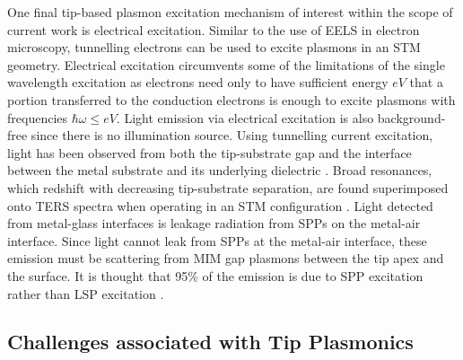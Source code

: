 \documentclass{article}
\begin{document}
One final tip-based plasmon excitation mechanism of interest within the scope of current work is electrical excitation. Similar to the use of EELS in electron microscopy, tunnelling electrons can be used to excite plasmons in an STM geometry. Electrical excitation circumvents some of the limitations of the single wavelength excitation as electrons need only to have sufficient energy $eV$ that a portion transferred to the conduction electrons is enough to excite plasmons with frequencies $\hbar\omega \leq eV$. Light emission via electrical excitation is also background-free since there is no illumination source. Using tunnelling current excitation, light has been observed from both the tip-substrate gap \cite{pettinger2007, pettinger2009} and the interface between the metal substrate and its underlying dielectric \cite{wang2011}. Broad resonances, which redshift with decreasing tip-substrate separation, are found superimposed onto TERS spectra when operating in an STM configuration \cite{pettinger2007, pettinger2009}. Light detected from metal-glass interfaces is leakage radiation from SPPs on the metal-air interface. Since light cannot leak from SPPs at the metal-air interface, these emission must be scattering from MIM gap plasmons between the tip apex and the surface. It is thought that 95\% of the emission is due to SPP excitation rather than LSP excitation \cite{wang2011}.

\subsection{Challenges associated with Tip Plasmonics}
\end{document}
